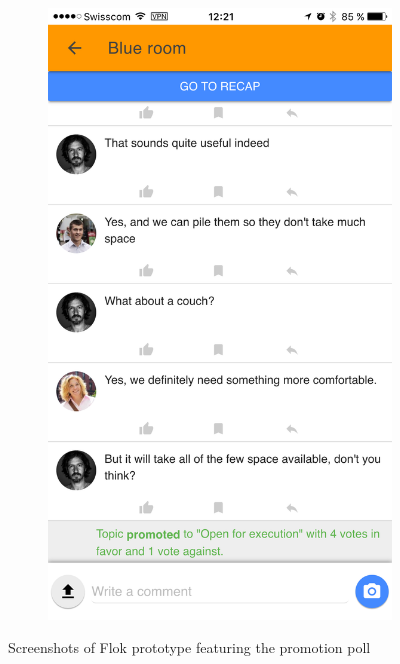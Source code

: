 \documentclass[a4paper,12pt, oneside]{article}
\begin{document}
\begin{figure}[!htb]
\begin{subfigure}[t]{.32\textwidth}
        \includegraphics[width=\textwidth]{images/promotionPoll_approved.png}
    \end{subfigure}
    \caption{Screenshots of Flok prototype featuring the promotion poll}
    \label{fig.promotionPoll}
\end{figure}
\end{document}
